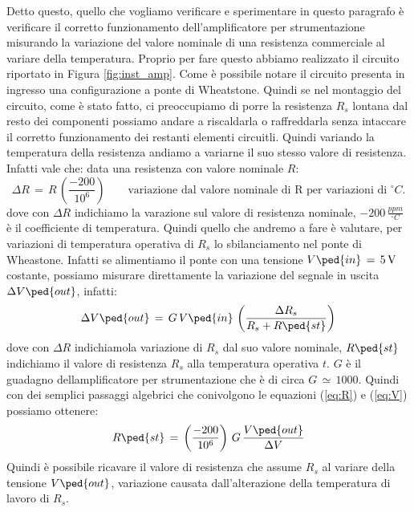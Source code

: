 Detto questo, quello che vogliamo verificare e sperimentare in questo paragrafo è verificare il corretto funzionamento dell'amplificatore per strumentazione misurando la variazione del valore nominale di una resistenza commerciale al variare della temperatura. Proprio per fare questo abbiamo realizzato il circuito riportato in Figura \ref{fig:inst_amp}. Come è possibile notare il circuito presenta in ingresso una configurazione a ponte di Wheatstone. Quindi se nel montaggio del circuito, come è stato fatto, ci preoccupiamo di porre la resistenza $R_s$ lontana dal resto dei componenti possiamo andare a riscaldarla o raffreddarla senza intaccare il corretto funzionamento dei restanti elementi circuitli. Quindi variando la temperatura della resistenza andiamo a variarne il suo stesso valore di resistenza. Infatti vale che: data una resistenza con valore nominale $R$:
\begin{equation}
        \Delta R\,=\,R\,\left(\frac{-200}{10^6}\right) \qquad \text{variazione dal valore nominale di R per variazioni di $^\circ C$.}
        \label{eq:R}
\end{equation}
dove con $\Delta R$ indichiamo la varazione sul valore di resistenza nominale, $-200\,\frac{ppm}{^\circ C}$ è il coefficiente di temperatura.
Quindi quello che andremo a fare è valutare, per variazioni di temperatura operativa di $R_s$ lo sbilanciamento nel ponte di Wheastone. Infatti se alimentiamo il ponte con una tensione $V\ped{in}\,=\,\SI{5}{\volt}$ costante, possiamo misurare direttamente la variazione del segnale in uscita $\Delta V\ped{out}$, infatti:
\begin{equation}
        \Delta V\ped{out}\,=\,G\,V\ped{in}\,\left(\frac{\Delta R_s}{R_s + R\ped{st}}\right)
        \label{eq:V}
\end{equation}
dove con $\Delta R$ indichiamola variazione di $R_s$ dal suo valore nominale, $R\ped{st}$ indichiamo il valore di resistenza $R_s$ alla temperatura operativa $t$. $G$ è il guadagno dellamplificatore per strumentazione che è di circa $G\,\simeq\,1000$.
Quindi con dei semplici passaggi algebrici che conivolgono le equazioni (\ref{eq:R}) e (\ref{eq:V}) possiamo ottenere:
\begin{equation}
        R\ped{st}\,=\,\left(\frac{-200}{10^6}\right)\,G\,\frac{V\ped{out}}{\Delta V}
        \label{eq:R_t}
\end{equation}
Quindi è possibile ricavare il valore di resistenza che assume $R_s$ al variare della tensione $V\ped{out}$, variazione causata dall'alterazione della temperatura di lavoro di $R_s$.

